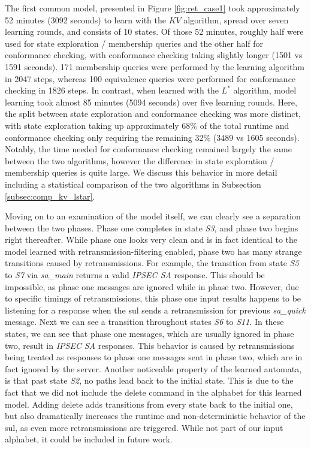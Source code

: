 The first common model, presented in Figure \ref{fig:ret_case1} took approximately 52 minutes (3092 seconds) to learn with the $KV$ algorithm, spread over seven learning rounds, and consists of 10 states. Of those 52 minutes, roughly half were used for state exploration / membership queries and the other half for conformance checking, with conformance checking taking slightly longer (1501 vs 1591 seconds). 171 membership queries were performed by the learning algorithm in 2047 steps, whereas 100 equivalence queries were performed for conformance checking in 1826 steps. In contrast, when learned with the $L^*$ algorithm, model learning took almost 85 minutes (5094 seconds) over five learning rounds. Here, the split between state exploration and conformance checking was more distinct, with state exploration taking up approximately 68\% of the total runtime and conformance checking only requiring the remaining 32\% (3489 vs 1605 seconds). Notably, the time needed for conformance checking remained largely the same between the two algorithms, however the difference in state exploration / membership queries is quite large. We discuss this behavior in more detail including a statistical comparison of the two algorithms in Subsection \ref{subsec:comp_kv_lstar}.

Moving on to an examination of the model itself, we can clearly see a separation between the two phases. Phase one completes in state \emph{S3}, and phase two begins right thereafter. While phase one looks very clean and is in fact identical to the model learned with retransmission-filtering enabled, phase two has many strange transitions caused by retransmissions. For example, the transition from state \emph{S5} to \emph{S7} via \emph{sa\_main} returns a valid \emph{IPSEC SA} response. This should be impossible, as phase one messages are ignored while in phase two. However, due to specific timings of retransmissions, this phase one input results happens to be listening for a response when the \ac{sul} sends a retransmission for previous \emph{sa\_quick} message. Next we can see a transition throughout states \emph{S6} to \emph{S11}. In these states, we can see that phase one messages, which are usually ignored in phase two, result in \emph{IPSEC SA} responses. This behavior is caused by retransmissions being treated as responses to phase one messages sent in phase two, which are in fact ignored by the server. Another noticeable property of the learned automata, is that past state \emph{S2}, no paths lead back to the initial state. This is due to the fact that we did not include the delete command in the alphabet for this learned model. Adding delete adds transitions from every state back to the initial one, but also dramatically increases the runtime and non-deterministic behavior of the \ac{sul}, as even more retransmissions are triggered. While not part of our input alphabet, it could be included in future work.

